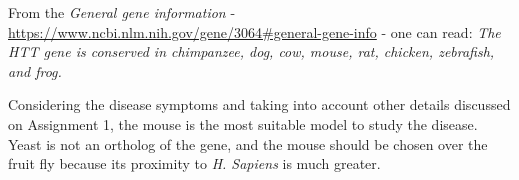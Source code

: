 From the \textit{General gene information} - \url{https://www.ncbi.nlm.nih.gov/gene/3064#general-gene-info} - one can read: \textit{The HTT gene is conserved in chimpanzee, dog, cow, mouse, rat, chicken, zebrafish, and frog.}

Considering the disease symptoms and taking into account other details discussed on Assignment 1, the mouse is the most suitable model to study the disease. Yeast is not an ortholog of the gene, and the mouse should be chosen over the fruit fly because its proximity to \textit{H. Sapiens} is much greater.

\newpage
